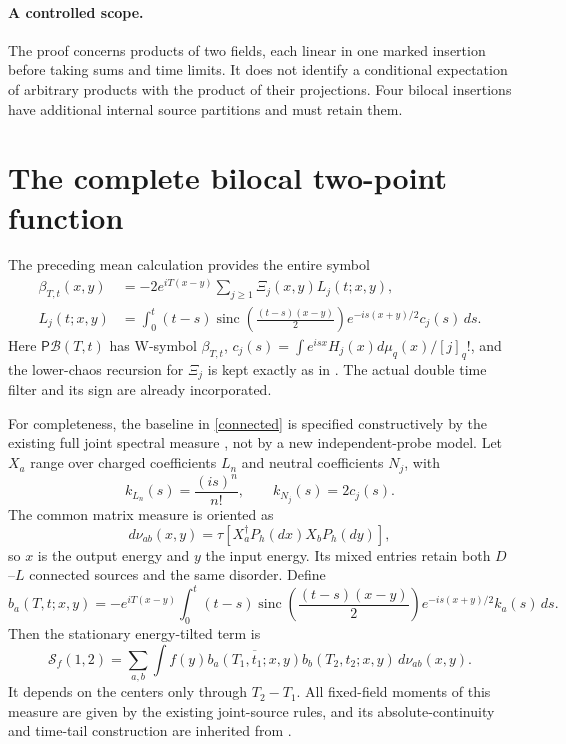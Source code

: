 \documentclass[11pt]{article}
\newcommand{\tr}{\tau}
\newcommand{\PP}{\mathsf P}
\newcommand{\sinc}{\operatorname{sinc}}
\begin{document}
\paragraph{A controlled scope.}
The proof concerns products of two fields, each linear in one
marked insertion before taking sums and time limits. It does not
identify a conditional expectation of arbitrary products with
the product of their projections. Four bilocal insertions have
additional internal source partitions and must retain them.

\newpage
\section{The complete bilocal two-point function}
The preceding mean calculation provides the entire symbol
\begin{align}\label{betaB}
 \beta_{T,t}(x,y)&=-2e^{iT(x-y)}\sum_{j\ge1}\Xi_j(x,y)L_j(t;x,y),\\
 L_j(t;x,y)&=\int_0^t(t-s)\sinc\!\left(\frac{(t-s)(x-y)}2\right)
              e^{-is(x+y)/2}c_j(s)\,ds.
\end{align}
Here $\PP\mathcal B(T,t)$ has W-symbol $\beta_{T,t}$,
$c_j(s)=\int e^{isx}H_j(x)d\mu_q(x)/[j]_q!$, and the
lower-chaos recursion for $\Xi_j$ is kept exactly as in \cite{mean}.
The actual double time filter and its sign are already incorporated.

For completeness, the baseline in \eqref{connected} is specified
constructively by the existing full joint spectral measure
\cite{joint,sector}, not by a new independent-probe model.
Let $X_a$ range over charged coefficients $L_n$ and neutral
coefficients $N_j$, with
\[
 k_{L_n}(s)=\frac{(is)^n}{n!},\qquad k_{N_j}(s)=2c_j(s).
\]
The common matrix measure is oriented as
\[
 d\nu_{ab}(x,y)=\tr[X_a^\dagger P_h(dx)X_bP_h(dy)],
\]
so $x$ is the output energy and $y$ the input energy. Its mixed
entries retain both $D$--$L$ connected sources and the same
disorder. Define
\[
 b_a(T,t;x,y)=-e^{iT(x-y)}\int_0^t(t-s)
 \sinc\!\left(\frac{(t-s)(x-y)}2\right)
 e^{-is(x+y)/2}k_a(s)\,ds.
\]
Then the stationary energy-tilted term is
\begin{equation}\label{base}
 \mathcal S_f(1,2)=\sum_{a,b}\int f(y)
 \overline{b_a(T_1,t_1;x,y)}b_b(T_2,t_2;x,y)\,d\nu_{ab}(x,y).
\end{equation}
It depends on the centers only through $T_2-T_1$.
All fixed-field moments of this measure are given by the existing
joint-source rules, and its absolute-continuity and time-tail
construction are inherited from \cite{joint,desc,sector}.
\end{document}
